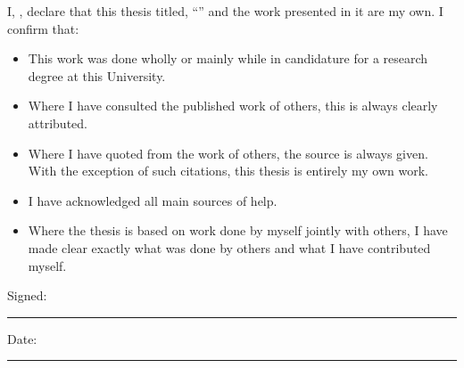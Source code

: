 \begin{declaration}
    \addchaptertocentry{\authorshipname} %
    \noindent I, \authorname, declare that this thesis titled, \enquote{\ttitle} and the work presented in it are my own. I confirm that:

    \begin{itemize}
        \item This work was done wholly or mainly while in candidature for a research degree at this University.
        \item Where I have consulted the published work of others, this is always clearly attributed.
        \item Where I have quoted from the work of others, the source is always given. With the exception of such citations, this thesis is entirely my own work.
        \item I have acknowledged all main sources of help.
        \item Where the thesis is based on work done by myself jointly with others, I have made clear exactly what was done by others and what I have contributed myself.\\
    \end{itemize}

    \noindent Signed: \\
    \rule[0.5em]{25em}{0.5pt} %

    \noindent Date: \\
    \rule[0.5em]{25em}{0.5pt} %
\end{declaration}
